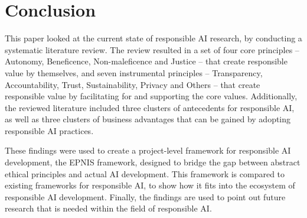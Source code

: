 \section{Conclusion}
\label{sec:Conclusion}

This paper looked at the current state of responsible AI research, by conducting a systematic literature review. The review resulted in a set of four core principles -- Autonomy, Beneficence, Non-maleficence and Justice -- that create responsible value by themselves, and seven instrumental principles -- Transparency, Accountability, Trust, Sustainability, Privacy and Others -- that create responsible value by facilitating for and supporting the core values. Additionally, the reviewed literature included three clusters of antecedents for responsible AI, as well as three clusters of business advantages that can be gained by adopting responsible AI practices.

These findings were used to create a project-level framework for responsible AI development, the EPNIS framework, designed to bridge the gap between abstract ethical principles and actual AI development. This framework is compared to existing frameworks for responsible AI, to show how it fits into the ecosystem of responsible AI development. Finally, the findings are used to point out future research that is needed within the field of responsible AI.
